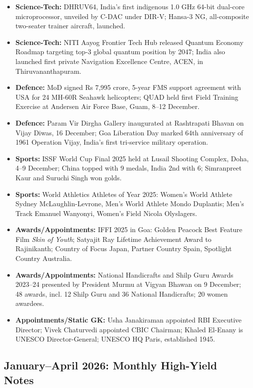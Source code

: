 \documentclass[10pt,a4paper]{article}
\begin{document}
\begin{itemize}
    \item \textbf{Science-Tech:} DHRUV64, India's first indigenous 1.0 GHz 64-bit dual-core microprocessor, unveiled by C-DAC under DIR-V; Hansa-3 NG, all-composite two-seater trainer aircraft, launched.
    \item \textbf{Science-Tech:} NITI Aayog Frontier Tech Hub released Quantum Economy Roadmap targeting top-3 global quantum position by 2047; India also launched first private Navigation Excellence Centre, ACEN, in Thiruvananthapuram.
    \item \textbf{Defence:} MoD signed Rs 7,995 crore, 5-year FMS support agreement with USA for 24 MH-60R Seahawk helicopters; QUAD held first Field Training Exercise at Andersen Air Force Base, Guam, 8--12 December.
    \item \textbf{Defence:} Param Vir Dirgha Gallery inaugurated at Rashtrapati Bhavan on Vijay Diwas, 16 December; Goa Liberation Day marked 64th anniversary of 1961 Operation Vijay, India's first tri-service military operation.
    \item \textbf{Sports:} ISSF World Cup Final 2025 held at Lusail Shooting Complex, Doha, 4--9 December; China topped with 9 medals, India 2nd with 6; Simranpreet Kaur and Suruchi Singh won golds.
    \item \textbf{Sports:} World Athletics Athletes of Year 2025: Women's World Athlete Sydney McLaughlin-Levrone, Men's World Athlete Mondo Duplantis; Men's Track Emanuel Wanyonyi, Women's Field Nicola Olyslagers.
    \item \textbf{Awards/Appointments:} IFFI 2025 in Goa: Golden Peacock Best Feature Film \textit{Skin of Youth}; Satyajit Ray Lifetime Achievement Award to Rajinikanth; Country of Focus Japan, Partner Country Spain, Spotlight Country Australia.
    \item \textbf{Awards/Appointments:} National Handicrafts and Shilp Guru Awards 2023--24 presented by President Murmu at Vigyan Bhawan on 9 December; 48 awards, incl. 12 Shilp Guru and 36 National Handicrafts; 20 women awardees.
    \item \textbf{Appointments/Static GK:} Usha Janakiraman appointed RBI Executive Director; Vivek Chaturvedi appointed CBIC Chairman; Khaled El-Enany is UNESCO Director-General; UNESCO HQ Paris, established 1945.
\end{itemize}

\subsection{January--April 2026: Monthly High-Yield Notes}
\end{document}
